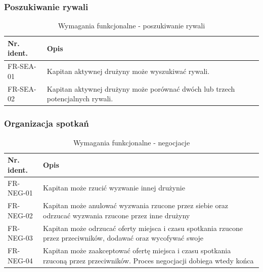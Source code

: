 \subsubsection{Poszukiwanie rywali}

\begin{table}[H]
\centering\small
\caption{Wymagania funkcjonalne - poszukiwanie rywali}
\label{tab:szablon}
\begin{tabularx}{\linewidth}{|p{.2\linewidth}|X|}\hline
Nr. ident. & Opis \\ \hline\hline

FR-SEA-01 & Kapitan aktywnej drużyny może wyszukiwać rywali. \\ \hline

FR-SEA-02 & Kapitan aktywnej drużyny może porównać dwóch lub trzech potencjalnych rywali. \\ \hline

\end{tabularx}
\end{table}


\subsubsection{Organizacja spotkań}

\begin{table}[H]
\centering\small
\caption{Wymagania funkcjonalne - negocjacje}
\label{tab:szablon}
\begin{tabularx}{\linewidth}{|p{.2\linewidth}|X|}\hline
Nr. ident. & Opis \\ \hline\hline

FR-NEG-01 & Kapitan może rzucić wyzwanie innej drużynie  \\ \hline
FR-NEG-02 & Kapitan może anulować wyzwania rzucone przez siebie oraz odrzucać wyzwania rzucone przez inne drużyny  \\ \hline
FR-NEG-03 & Kapitan może odrzucać oferty miejsca i czasu spotkania rzucone przez przeciwników, dodawać oraz wycofywać swoje  \\ \hline
FR-NEG-04 & Kapitan może zaakceptować ofertę miejsca i czasu spotkania rzuconą przez przeciwników. Proces negocjacji dobiega wtedy końca  \\ \hline

\end{tabularx}
\end{table}

